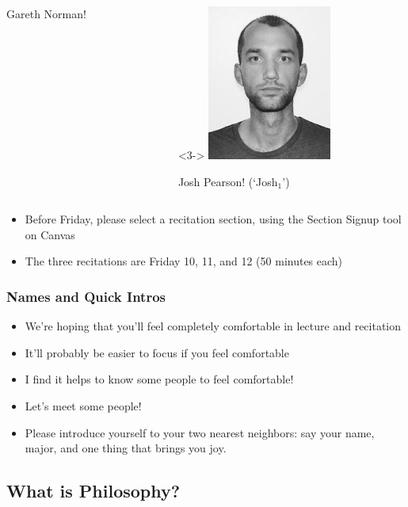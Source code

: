 \begin{frame}
\begin{columns}
\begin{column}{.27\textwidth}
      Gareth Norman!
    \end{column}
 \begin{column}{.35\textwidth}<3->
     \includegraphics[height=.7\textheight]{../assets/pearson}
      
      Josh Pearson! (`Josh$_1$')
    \end{column}
  \end{columns}

\begin{itemize}[<+->]

\item Before Friday, please select a recitation section, using the Section Signup tool on Canvas

\item The three recitations are Friday 10, 11, and 12 (50 minutes each)
\end{itemize}
\end{frame}
  
  \begin{frame}
  \frametitle{Names and Quick Intros}
  
    \begin{itemize}[<+->]
    \item We're hoping that you'll feel completely comfortable in lecture and recitation
    \item It'll probably be easier to focus if you feel comfortable
    \item I find it helps to know some people to feel comfortable!
\item Let's meet some people!
\item Please introduce yourself to your two nearest neighbors: say your name, major, and one thing that brings you joy. 
  \end{itemize}
  
  \end{frame}

\subsection{What is Philosophy?}


